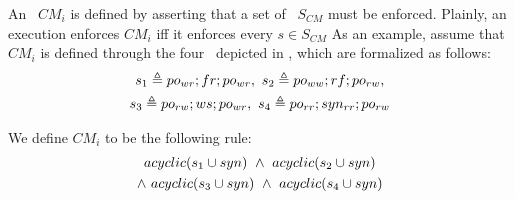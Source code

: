 An \mcm\ $CM_i$ is defined by asserting that a set
of \synpats\ $S_{CM}$ must be enforced. Plainly, an execution enforces $CM_i$ iff it enforces every $s \in S_{CM}$
As an example, assume that $CM_i$ is defined through the four \synpats\  depicted in , which are formalized as follows:
\begin{gather*}
    s_1 \triangleq po_{wr} ; fr ; po_{wr}, \
    s_2 \triangleq po_{ww} ; rf ; po_{rw}, \\
    s_3 \triangleq po_{rw} ; ws ; po_{wr}, \
    s_4 \triangleq po_{rr} ; syn_{rr} ; po_{rw}
\end{gather*}

We define $CM_i$ to be the following rule:
\begin{gather*}
    acyclic(s_1 \cup syn)\
    \andm\ acyclic(s_2 \cup syn)\\ 
    \andm\ acyclic(s_3 \cup syn)\ 
    \andm\ acyclic(s_4 \cup syn)
\end{gather*}




